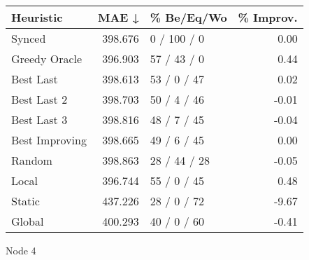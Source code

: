 \begin{tabular}{lrlr}
\toprule
\textbf{Heuristic} & \textbf{MAE ↓} & \textbf{\% Be/Eq/Wo} & \textbf{\% Improv.} \\
\midrule
            Synced &        398.676 &          0 / 100 / 0 &                0.00 \\
     Greedy Oracle &        396.903 &          57 / 43 / 0 &                0.44 \\
         Best Last &        398.613 &          53 / 0 / 47 &                0.02 \\
       Best Last 2 &        398.703 &          50 / 4 / 46 &               -0.01 \\
       Best Last 3 &        398.816 &          48 / 7 / 45 &               -0.04 \\
    Best Improving &        398.665 &          49 / 6 / 45 &                0.00 \\
            Random &        398.863 &         28 / 44 / 28 &               -0.05 \\
             Local &        396.744 &          55 / 0 / 45 &                0.48 \\
            Static &        437.226 &          28 / 0 / 72 &               -9.67 \\
            Global &        400.293 &          40 / 0 / 60 &               -0.41 \\
\bottomrule
\end{tabular}
\caption{Node 4}
\label{tab:non_lr01_le2_bs2_4}
